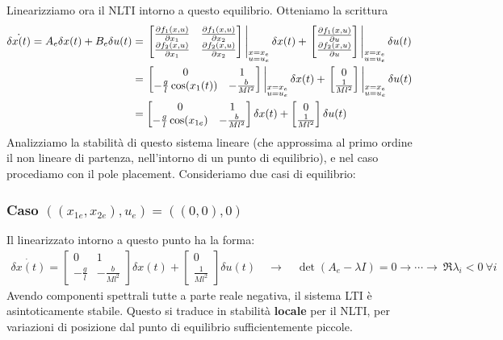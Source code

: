 \documentclass[a4paper]{report}
\begin{document}
\begin{esem}
Linearizziamo ora il NLTI intorno a questo equilibrio. Otteniamo la scrittura
\begin{align*}
	\dot{\delta x(t)} = A_e \delta x(t) + B_e \delta u(t) & = \eval{\begin{bmatrix}
		\pdv{f_1(x, u)}{x_1} & \pdv{f_1(x, u)}{x_2} \\
		\pdv{f_2(x, u)}{x_1} & \pdv{f_2(x, u)}{x_2}
	\end{bmatrix}}_{\substack{x=x_e \\ u=u_e}}  \delta x(t) + \eval{\begin{bmatrix}
		\pdv{f_1(x, u)}{u} \\ \pdv{f_2(x, u)}{u}
	\end{bmatrix}}_{\substack{x=x_e \\ u=u_e}}  \delta u(t) \\ & = \eval{\begin{bmatrix}
		0 & 1 \\ -\frac{g}{l} \cos(x_{1}(t)) & -\frac{b}{Ml^2} 
	\end{bmatrix}}_{\substack{x=x_e \\ u=u_e}}  \delta x(t) + \eval{\begin{bmatrix}
		0 \\ \frac{1}{Ml^2}
	\end{bmatrix}}_{\substack{x=x_e \\ u=u_e}} \delta u(t) \\ & = \begin{bmatrix}
		0 & 1 \\ -\frac{g}{l} \cos(x_{1e}) & -\frac{b}{Ml^2} 
	\end{bmatrix}  \delta x(t) + \begin{bmatrix}
		0 \\ \frac{1}{Ml^2}
	\end{bmatrix} \delta u(t) 
\end{align*}
Analizziamo la stabilità di questo sistema lineare (che approssima al primo ordine il non lineare di partenza, nell'intorno di un punto di equilibrio), e nel caso procediamo con il pole placement. Consideriamo due casi di equilibrio:
\subsubsection{Caso $((x_{1e}, x_{2e}), u_e) = ((0,0), 0)$}
Il linearizzato intorno a questo punto ha la forma:
\begin{align*}
	\dot{\delta x(t)} = \begin{bmatrix}
 0 & 1 \\ -\frac{g}{l} & - \frac{b}{Ml^2}	
 \end{bmatrix} \delta x(t) + \begin{bmatrix}
 	0 \\ \frac{1}{Ml^2}
 \end{bmatrix} \delta u(t) \quad \rightarrow \quad 
	\det(A_e - \lambda I) = 0 \rightarrow \cdots \rightarrow \ \Re{\lambda_i} < 0 \ \forall i
\end{align*}
Avendo componenti spettrali tutte a parte reale negativa, il sistema LTI è asintoticamente stabile. Questo si traduce in stabilità \textbf{locale} per il NLTI, per variazioni di posizione dal punto di equilibrio sufficientemente piccole.


\end{esem}
\end{document}

